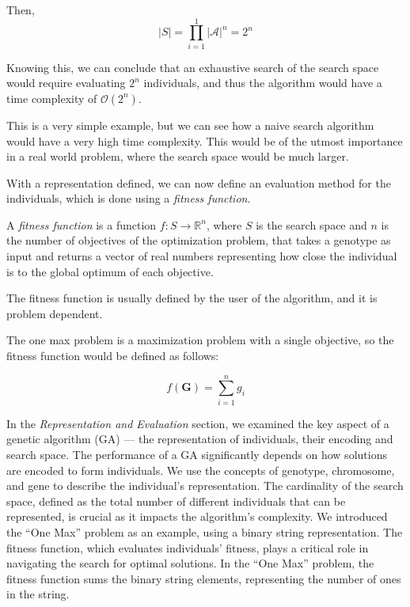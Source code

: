   Then,
  \[
    |S| = \prod_{i=1}^1 |\mathcal{A}|^n = 2^n
  \]

  Knowing this, we can conclude that an exhaustive search of the search space would require 
  evaluating \(2^n\) individuals, and thus the algorithm would have a time complexity of 
  \(\mathcal{O}(2^n)\).
  
  This is a very simple example, but we can see how a naive search algorithm would have a very
  high time complexity.
  This would be of the utmost importance in a real world problem, where the search space would be
  much larger.

  With a representation defined, we can now define an evaluation method for the individuals, which
  is done using a \emph{fitness function}.

  \begin{definition}
  \label{def:fitness_function}
    A \emph{fitness function} is a function \(f: S \rightarrow \mathbb{R}^n\), where \(S\) is the
    search space and \(n\) is the number of objectives of the optimization problem, that takes a
    genotype as input and returns a vector of real numbers representing how close the individual 
    is to the global optimum of each objective.

    The fitness function is usually defined by the user of the algorithm, and it is problem
    dependent.
  \end{definition}

  The one max problem is a maximization problem with a single objective, so the fitness function
  would be defined as follows:

  \begin{equation}
    \label{eq:fitness_function:one_max}
    f(\mathbf{G}) = \sum_{i=1}^n g_i
  \end{equation}

  In the \emph{Representation and Evaluation} section, we examined the key aspect of a genetic 
  algorithm (GA) — the representation of individuals, their encoding and search space.
  The performance of a GA significantly depends on how solutions are encoded to form individuals.
  We use the concepts of genotype, chromosome, and gene to describe the individual's representation.
  The cardinality of the search space, defined as the total number of different individuals that can
  be represented, is crucial as it impacts the algorithm's complexity.
  We introduced the \enquote{One Max} problem as an example, using a binary string representation.
  The fitness function, which evaluates individuals' fitness, plays a critical role in navigating 
  the search for optimal solutions.
  In the \enquote{One Max} problem, the fitness function sums the binary string elements, 
  representing the number of ones in the string.